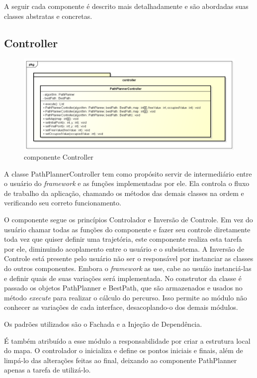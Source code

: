 A seguir cada componente é descrito mais detalhadamente e são abordadas suas classes abstratas e concretas.

\subsection{Controller}

\begin{figure}[h]
	\centering
	\label{fig22}
		\includegraphics[keepaspectratio=true,scale=0.5]{figuras/pkgcontroller.png}
	\caption{componente Controller}
\end{figure}

A classe PathPlannerController tem como propósito servir de intermediário entre o usuário do \textit{framework} e as funções implementadas por ele. Ela controla o fluxo de trabalho da aplicação, chamando os métodos das demais classes na ordem e verificando seu correto funcionamento.

O componente segue os princípios Controlador e Inversão de Controle. Em vez do usuário chamar todas as funções do componente e fazer seu controle diretamente toda vez que quiser definir uma trajetória, este componente realiza esta tarefa por ele, diminuindo acoplamento entre o usuário e o subsistema. A Inversão de Controle está presente pelo usuário não ser o responsável por instanciar as classes do outros componentes. Embora o \textit{framework} as use, cabe ao usuáio instanciá-las e definir quais de suas variações será implementada. No construtor da classe é passado os objetos PathPlanner e BestPath, que são armazenados e usados no método \textit{execute} para realizar o cálculo do percurso. Isso permite ao módulo não conhecer as variações de cada interface, desacoplando-o dos demais módulos.

Os padrões utilizados são o Fachada e a Injeção de Dependência.

É também atribuído a esse módulo a responsabilidade por criar a estrutura local do mapa. O controlador o inicializa e define os pontos iniciais e finais, além de limpá-lo das alterações feitas ao final, deixando ao componente PathPlanner apenas a tarefa de utilizá-lo.

